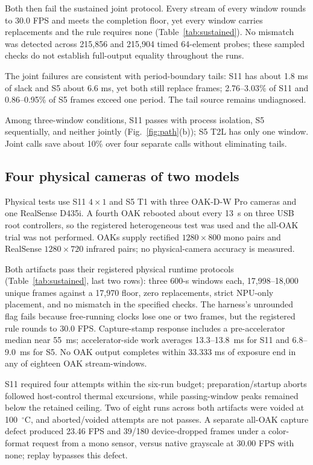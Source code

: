 \documentclass[sigconf,review,anonymous]{acmart}
\begin{document}
Both then fail the sustained joint protocol. Every stream of every window rounds to 30.0 FPS and meets the completion floor, yet every window carries replacements and the rule requires none (Table~\ref{tab:sustained}). No mismatch was detected across 215,856 and 215,904 timed 64-element probes; these sampled checks do not establish full-output equality throughout the runs.

The joint failures are consistent with period-boundary tails: S11 has about 1.8 ms of slack and S5 about 6.6 ms, yet both still replace frames; 2.76--3.03\% of S11 and 0.86--0.95\% of S5 frames exceed one period. The tail source remains undiagnosed.

Among three-window conditions, S11 passes with process isolation, S5 sequentially, and neither jointly (Fig.~\ref{fig:path}(b)); S5 T2L has only one window. Joint calls save about 10\% over four separate calls without eliminating tails.

\subsection{Four physical cameras of two models}
\label{sec:physical}
Physical tests use S11 $4\times1$ and S5 T1 with three OAK-D-W Pro cameras and one RealSense D435i. A fourth OAK rebooted about every 13~s on three USB root controllers, so the registered heterogeneous test was used and the all-OAK trial was not performed. OAKs supply rectified $1280\times800$ mono pairs and RealSense $1280\times720$ infrared pairs; no physical-camera accuracy is measured.

Both artifacts pass their registered physical runtime protocols (Table~\ref{tab:sustained}, last two rows): three 600-s windows each, 17,998--18,000 unique frames against a 17,970 floor, zero replacements, strict NPU-only placement, and no mismatch in the specified checks. The harness's unrounded flag fails because free-running clocks lose one or two frames, but the registered rule rounds to 30.0 FPS. Capture-stamp response includes a pre-accelerator median near 55~ms; accelerator-side work averages 13.3--13.8~ms for S11 and 6.8--9.0~ms for S5. No OAK output completes within 33.333 ms of exposure end in any of eighteen OAK stream-windows.

S11 required four attempts within the six-run budget; preparation/startup aborts followed host-control thermal excursions, while passing-window peaks remained below the retained ceiling. Two of eight runs across both artifacts were voided at 100~$^\circ$C, and aborted/voided attempts are not passes. A separate all-OAK capture defect produced 23.46 FPS and 39/180 device-dropped frames under a color-format request from a mono sensor, versus native grayscale at 30.00 FPS with none; replay bypasses this defect.
\end{document}
